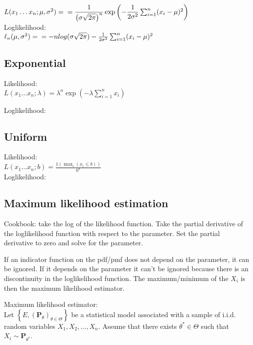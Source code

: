 $L(x_1\dots x_n;\mu,\sigma^2)=\\ 
= \dfrac{1}{\left(\sigma\sqrt{2\pi}\right)^n}\exp{\left(-\dfrac{1}{2\sigma^2}\sum_{i=1}^n (x_i-\mu)^2 \right)}$\\

Loglikelihood:\\

$\ell_n (\mu,\sigma^2)= \\
= -n log(\sigma\sqrt{2\pi})-\frac{1}{2\sigma^2}\sum_{i=1}^n (x_i-\mu)^2 $


\subsection*{Exponential}

Likelihood:\\
$L(x_1\dots x_n;\lambda)=\lambda^n\exp\left(-\lambda\sum_{i=1}^n x_i\right)$

Loglikelihood:\\

\subsection*{Uniform}

Likelihood:\\
$L(x_1\dots x_n;b)=\frac{1(\max_i (x_i \leq b))} {b^n}$\\

Loglikelihood:\\

\subsection*{Maximum likelihood estimation}

Cookbook: take the log of the likelihood function. Take the partial derivative of the loglikelihood function with respect to the parameter. Set the partial derivative to zero and solve for the parameter.

If an indicator function on the pdf/pmf does not depend on the parameter, it can be ignored. If it depends on the parameter it can't be ignored because there is an discontinuity in the loglikelihood function. The maximum/minimum of the $X_i$ is then the maximum likelihood estimator.

Maximum likelihood estimator:\\

Let $\left\{ E,\left(\mathbf{P}_{\theta }\right)_{\theta \in \Theta }\right\}$  be a statistical model associated with a sample of i.i.d. random variables $X_1, X_2, \dots , X_ n$. Assume that there exists $\theta ^* \in \Theta$ such that $X_ i \sim \mathbf{P}_{\theta ^*}$.

